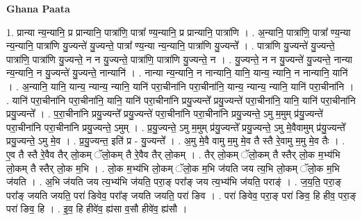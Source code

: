 \documentclass[17pt]{extarticle}
\begin{document}
\textbf{Ghana Paata } \newline

1. प्रान्या न्य॒न्यानि॒ प्र प्रान्यानि॒ पात्रा॑णि॒ पात्रा᳚ ण्य॒न्यानि॒ प्र प्रान्यानि॒ पात्रा॑णि । . अ॒न्यानि॒ पात्रा॑णि॒ पात्रा᳚ ण्य॒न्या न्य॒न्यानि॒ पात्रा॑णि यु॒ज्यन्ते॑ यु॒ज्यन्ते॒ पात्रा᳚ ण्य॒न्या न्य॒न्यानि॒ पात्रा॑णि यु॒ज्यन्ते᳚ । . पात्रा॑णि यु॒ज्यन्ते॑ यु॒ज्यन्ते॒ पात्रा॑णि॒ पात्रा॑णि यु॒ज्यन्ते॒ न न यु॒ज्यन्ते॒ पात्रा॑णि॒ पात्रा॑णि यु॒ज्यन्ते॒ न । . यु॒ज्यन्ते॒ न न यु॒ज्यन्ते॑ यु॒ज्यन्ते॒ नान्या न्य॒न्यानि॒ न यु॒ज्यन्ते॑ यु॒ज्यन्ते॒ नान्यानि॑ । . नान्या न्य॒न्यानि॒ न नान्यानि॒ यानि॒ यान्य॒ न्यानि॒ न नान्यानि॒ यानि॑ । . अ॒न्यानि॒ यानि॒ यान्य॒ न्यान्य॒ न्यानि॒ यानि॑ परा॒चीना॑नि परा॒चीना॑नि॒ यान्य॒ न्यान्य॒ न्यानि॒ यानि॑ परा॒चीना॑नि । . यानि॑ परा॒चीना॑नि परा॒चीना॑नि॒ यानि॒ यानि॑ परा॒चीना॑नि प्रयु॒ज्यन्ते᳚ प्रयु॒ज्यन्ते॑ परा॒चीना॑नि॒ यानि॒ यानि॑ परा॒चीना॑नि प्रयु॒ज्यन्ते᳚ । . प॒रा॒चीना॑नि प्रयु॒ज्यन्ते᳚ प्रयु॒ज्यन्ते॑ परा॒चीना॑नि परा॒चीना॑नि प्रयु॒ज्यन्ते॒ ऽमु म॒मुम् प्र॑यु॒ज्यन्ते॑ परा॒चीना॑नि परा॒चीना॑नि प्रयु॒ज्यन्ते॒ ऽमुम् । . प्र॒यु॒ज्यन्ते॒ ऽमु म॒मुम् प्र॑यु॒ज्यन्ते᳚ प्रयु॒ज्यन्ते॒ ऽमु मे॒वैवामुम् प्र॑यु॒ज्यन्ते᳚ प्रयु॒ज्यन्ते॒ ऽमु मे॒व । . प्र॒यु॒ज्यन्त॒ इति॑ प्र - यु॒ज्यन्ते᳚ । . अ॒मु मे॒वै वामु म॒मु मे॒व तै स्तै रे॒वामु म॒मु मे॒व तैः । . ए॒व तै स्तै रे॒वैव तैर् लो॒कम् ॅलो॒कम् तै रे॒वैव तैर् लो॒कम् । . तैर् लो॒कम् ॅलो॒कम् तै स्तैर् लो॒क म॒भ्य॑भि लो॒कम् तै स्तैर् लो॒क म॒भि । . लो॒क म॒भ्य॑भि लो॒कम् ॅलो॒क म॒भि ज॑यति जय त्य॒भि लो॒कम् ॅलो॒क म॒भि ज॑यति । . अ॒भि ज॑यति जय त्य॒भ्य॑भि ज॑यति॒ परा॒ङ् परा᳚ङ् जय त्य॒भ्य॑भि ज॑यति॒ पराङ्॑ । . ज॒य॒ति॒ परा॒ङ् परा᳚ङ् जयति जयति॒ परा॑ ङिवेव॒ परा᳚ङ् जयति जयति॒ परा॑ ङिव । . परा॑ ङिवेव॒ परा॒ङ् परा॑ ङिव॒ हि हीव॒ परा॒ङ् परा॑ ङिव॒ हि । . इ॒व॒ हि हीवे॑व॒ ह्य॑सा व॒सौ हीवे॑व॒ ह्य॑सौ । \newline
\end{document}
